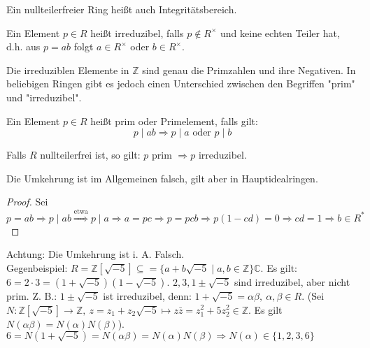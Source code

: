 
\begin{definition}
    Ein nullteilerfreier Ring hei\ss t auch Integrit\"atsbereich.
\end{definition}


\begin{definition}
    Ein Element $p \in R$ heißt irreduzibel, falls $p \notin R^{\times}$ und keine echten Teiler hat,
    d.h. aus $p=a b$ folgt $a \in R^{\times}$ oder $b \in R^{\times}$.
\end{definition}

Die irreduziblen Elemente in $\mathbb{Z}$ sind genau die Primzahlen und ihre Negativen. In beliebigen Ringen gibt es jedoch einen Unterschied zwischen den Begriffen "prim" und "irreduzibel".


\begin{definition}
    Ein Element $p \in R$ heißt prim oder Primelement, falls gilt:
    $$
    p\mid a b \Longrightarrow p\mid a \text { oder } p \mid b
    $$
\end{definition}


\begin{remark}
    Falls $R$ nullteilerfrei ist, so gilt: $p$ prim $\Longrightarrow p$ irreduzibel.
\end{remark}

Die Umkehrung ist im Allgemeinen falsch, gilt aber in Hauptidealringen.

\begin{proof}
    Sei \(p=ab\Rightarrow p\mid ab\stackrel{\text{etwa}}{\Rightarrow}p\mid a\Rightarrow a=pc\Rightarrow p=pcb\Rightarrow p(1-cd)=0\Rightarrow cd=1\Rightarrow b\in R^*\)
\end{proof}
\begin{remark}
    Achtung: Die Umkehrung ist i. A. Falsch.\\
    Gegenbeispiel: \(R=\mathbb{Z}[\sqrt{-5}]\subseteq = \{a+b\sqrt{-5}\mid a,b\in\mathbb{Z}\} \mathbb{C}\). Es gilt: \(6=2\cdot 3=(1+\sqrt{-5})(1-\sqrt{-5}).\) \(2,3,1\pm \sqrt{-5}\) sind irreduzibel, aber nicht prim. Z. B.: \(1\pm\sqrt{-5}\) ist irreduzibel, denn: \(1+\sqrt{-5}=\alpha\beta,\ \alpha,\beta\in R\).
    (Sei \(N:\mathbb{Z}[\sqrt{-5}]\longrightarrow\mathbb{Z},\ z=z_1+z_2\sqrt{-5}\mapsto z\bar{z}=z_1^2+5z_2^2\in\mathbb{Z}\). Es gilt \(N(\alpha\beta)=N(\alpha)N(\beta)\)). \(6=N(1+\sqrt{-5})=N(\alpha\beta)=N(\alpha)N(\beta)\Rightarrow N(\alpha)\in\{1,2,3,6\}\)
\end{remark}

